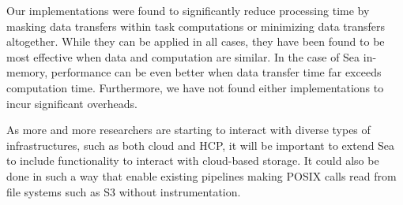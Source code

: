 Our implementations were found to significantly reduce processing time by masking data
transfers within task computations or minimizing data transfers altogether.
While they can be applied in all cases, they
have been found to be most effective when data and computation are similar. In the case of Sea in-memory,
performance can be even better when data transfer time far exceeds computation time.
Furthermore, we have not found either implementations to incur significant
overheads.

As more and more researchers are starting to interact with diverse types of
infrastructures, such as both cloud and HCP, it will be important to extend Sea
to include functionality to interact with cloud-based storage. It could also be
done in such a way that enable existing pipelines making POSIX calls read from
file systems such as S3 without instrumentation.




